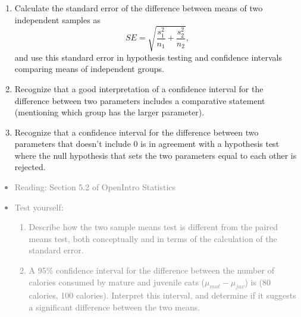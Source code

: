 \documentclass[11pt]{article}
\newcommand{\gray}[1]{\textcolor{gray}{#1}}
\begin{document}
\begin{enumerate}[resume]
\renewcommand\labelenumi{\textcolor{light}{\textbf{LO \theenumi.}}}

\item Calculate the standard error of the difference between means of two independent samples as
\[ SE = \sqrt{\frac{s_1^2}{n_1} + \frac{s_2^2}{n_2}}, \]
and use this standard error in hypothesis testing and confidence intervals comparing means of independent groups.

\item Recognize that a good interpretation of a confidence interval for the difference between two parameters includes a comparative statement (mentioning which group has the larger parameter).

\item Recognize that a confidence interval for the difference between two parameters that doesn't include 0 is in agreement with a hypothesis test where the null hypothesis that sets the two parameters equal to each other is rejected.

\end{enumerate}

\gray{
{\it
\vspace{-0.55cm}
\begin{itemize}
\renewcommand{\labelitemi}{{\textcolor{dark}{$\ast$}}}
\item Reading: Section 5.2 of OpenIntro Statistics
\item Test yourself:
\begin{enumerate}
\item Describe how the two sample means test is different from the paired means test, both conceptually and in terms of the calculation of the standard error.
\item A 95\% confidence interval for the difference between the number of calories consumed by mature and juvenile cats ($\mu_{mat} - \mu_{juv}$) is (80 calories, 100 calories). Interpret this interval, and determine if it suggests a significant difference between the two means.
\end{enumerate}
\end{itemize}
}}

%

\vspace{0.48cm}

%
\end{document}
